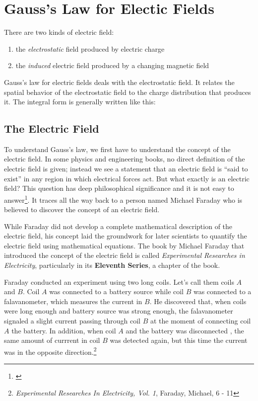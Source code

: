 \section{Gauss's Law for Electic Fields}

There are two kinds of electric field:

\begin{enumerate}
    \item the \textit{electrostatic} field produced by electric charge
    \item the \textit{induced} electric field produced by a changing magnetic field
\end{enumerate}

Gauss's law for electric fields deals with the electrostatic field. It relates the spatial behavior of the electrostatic
field to the charge distribution that produces it. The integral form is generally written like this:

\subsection{The Electric Field}

To understand Gauss's law, we first have to understand the concept of the electric field. In some physics and
engineering books, no direct definition of the electric field is given; instead we see a statement that an electric
field is ``said to exist'' in any region in which electrical forces act. But what exactly is an electric field? This
question has deep philosophical significance and it is not easy to
answer\footnote{\cite[p.~3]{student-maxwell-equations}}. It traces all the way back to a person named Michael Faraday
who is believed to discover the concept of an electric field.

While Faraday did not develop a complete mathematical description of the electric field, his concept laid the groundwork
for later scientists to quantify the electric field using mathematical equations. The book by Michael Faraday that
introduced the concept of the electric field is called \textit{Experimental Researches in Electricity}, particularly in
its \textbf{Eleventh Series}, a chapter of the book.

Faraday conducted an experiment using two long coils. Let's call them coils $A$ and $B$. Coil $A$ was connected to a
battery source while coil $B$ was connected to a falavanometer, which measures the current in $B$. He discovered that,
when coils were long enough and battery source was strong enough, the falavanometer signaled a slight current passing
through coil $B$ at the moment of connecting coil $A$ the battery. In addition, when coil $A$ and the battery was
disconnected , the same amount of currrent in coil $B$ was detected again, but this time the current was in the opposite
direction.\footnote{\textit{Experimental Researches In Electricity, Vol. 1}, Faraday, Michael, 6 - 11}
